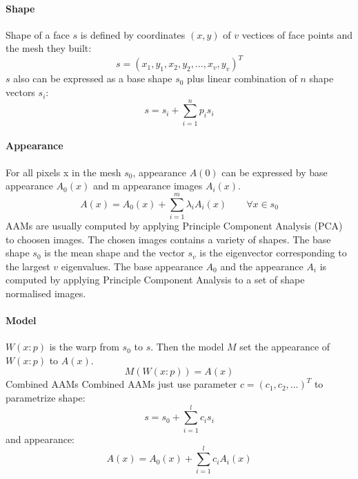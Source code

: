 \paragraph{Shape}
Shape of a face $s$ is defined by coordinates $(x,y)$ of $v$ vectices of face points and the mesh they built:
\begin{equation}
s = (x_{1},y_{1},x_{2},y_{2},...,x_{v},y_{v})^{T}
\end{equation}
\newline
$s$ also can be expressed as a base shape $s_{0}$ plus linear combination of $n$ shape vectors $s_{i}$:
\begin{equation}
s = s_{i} + \sum_{i =1}^{n}p_{i}s_{i}
\end{equation}
\newline
\paragraph{Appearance}
For all pixels x in the mesh $s_{0}$, appearance $A(0)$ can be expressed by base appearance $A_{0}(x)$ and m appearance images $A_{i}(x)$.
\begin{equation}
A(x) = A_{0}(x) + \sum_{i=1}^{m}\lambda_{i}A_{i}(x) \qquad \forall x \in s_{0}
\end{equation}
\newline
AAMs are usually computed by applying Principle Component Analysis (PCA) to choosen images. The chosen images contains a variety of shapes. The base shape $s_{0}$ is the mean shape and the vector $s_{v}$ is the eigenvector corresponding to the largest $v$ eigenvalues. The base appearance $A_{0}$ and the appearance $A_{i}$ is computed by applying Principle Component Analysis to a set of shape normalised images.
\paragraph{Model} 
$W(x:p)$ is the warp from $s_{0}$ to $s$. Then the model $M$ set the appearance of $W(x:p)$ to $A(x)$.
\begin{equation}
M(W(x:p)) = A(x)
\end{equation}
\newline
Combined AAMs
\newline
Combined AAMs just use parameter $c = (c_{1},c_{2},...)^{T}$ to parametrize shape:
\begin{equation}
s = s_{0} + \sum_{i=1}^{l}c_{i}s_{i}
\end{equation}
and appearance:
\begin{equation}
A(x) = A_{0}(x) + \sum_{i=1}^{l}c_{i}A_{i}(x)
\end{equation}

